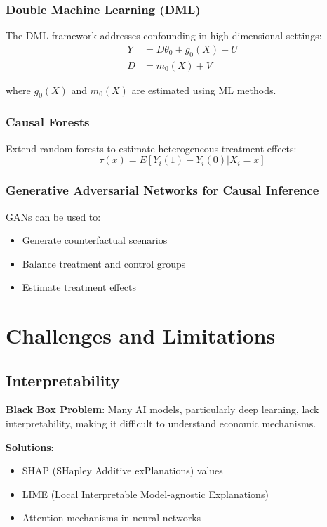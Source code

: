 \documentclass[12pt,a4paper]{article}
\begin{document}
\subsubsection{Double Machine Learning (DML)}

The DML framework addresses confounding in high-dimensional settings:
\begin{align}
Y &= D\theta_0 + g_0(X) + U \\
D &= m_0(X) + V
\end{align}

where $g_0(X)$ and $m_0(X)$ are estimated using ML methods.

\subsubsection{Causal Forests}

Extend random forests to estimate heterogeneous treatment effects:
\begin{equation}
\tau(x) = E[Y_i(1) - Y_i(0) | X_i = x]
\end{equation}

\subsubsection{Generative Adversarial Networks for Causal Inference}

GANs can be used to:
\begin{itemize}
    \item Generate counterfactual scenarios
    \item Balance treatment and control groups
    \item Estimate treatment effects
\end{itemize}

\section{Challenges and Limitations}

\subsection{Interpretability}

\textbf{Black Box Problem}: Many AI models, particularly deep learning, lack interpretability, making it difficult to understand economic mechanisms.

\textbf{Solutions}:
\begin{itemize}
    \item SHAP (SHapley Additive exPlanations) values
    \item LIME (Local Interpretable Model-agnostic Explanations)
    \item Attention mechanisms in neural networks
\end{itemize}
\end{document}
